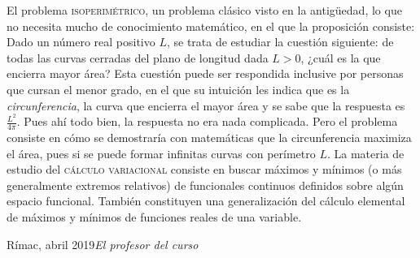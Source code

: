 \foreword
El problema \textsc{isoperimétrico}, un problema clásico visto en la antigüedad, lo que no necesita mucho de conocimiento matemático, en el que la proposición consiste: Dado
un número real positivo $L$, se trata de estudiar la cuestión siguiente: de todas las curvas cerradas del plano de longitud dada $L>0$, ¿cuál es la que encierra mayor área?
Esta cuestión puede ser respondida inclusive por personas que cursan el menor grado, en el que su intuición les indica que es la \emph{circunferencia}, la curva que encierra el mayor área y se sabe que la respuesta es $\tfrac{L^2}{4\pi}$. Pues ahí todo bien, la respuesta no era nada complicada. Pero el problema consiste en cómo se demostraría con matemáticas que la circunferencia maximiza el área, pues si se puede formar infinitas curvas con perímetro $L$. La materia de estudio del \textsc{cálculo variacional} consiste en buscar máximos y mínimos (o más generalmente extremos relativos) de funcionales continuos definidos sobre algún espacio funcional. También constituyen una generalización del cálculo elemental de máximos y mínimos de funciones reales de una variable.\par
\vspace{\baselineskip}
\begin{flushright}\noindent
Rímac, abril 2019\hfill {\it El profesor del curso}\\
\end{flushright}